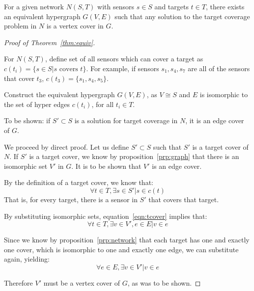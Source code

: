 \begin{thm}
  For a given network $N(S,T)$ with sensors $s\in S$ and targets $t\in T$, there exists an equivalent hypergraph $G(V,E)$ such that any solution to the target coverage problem in $N$ is a vertex cover in $G$.
\label{thm:equiv}
\end{thm}
\begin{proof}[Proof of Theorem~\ref{thm:equiv}]
\begin{prop}
For $N(S,T)$, define set of all sensors which can cover a target as $c(t_i) = \{s \in S | s \text{\ covers\ } t\}$.  For example, if sensors $s_1, s_4, s_7$ are all of the sensors that cover $t_3$, $c(t_3) = \{s_1, s_4, s_5\}$. \label{prp:network}
\end{prop}
\begin{prop}Construct the equivalent hypergraph $G(V,E)$, as $V \cong S$ and $E$ is isomorphic to the set of hyper edges $c(t_i)$, for all $t_i \in T$. 
\label{prp:graph}
\end{prop}

To be shown: if $S' \subset S$ is a solution for target coverage in $N$, it is an edge cover of $G$. 

We proceed by direct proof. Let us define $S'\subset S$ such that $S'$ is a target cover of $N$. If $S'$ is a target cover, we know by proposition~\ref{prp:graph} that there is an isomorphic set $V'$ in $G$. It is to be shown that $V'$ is an edge cover.

By the definition of a target cover, we know that:
\begin{equation}
\forall t \in T, \exists s \in S' | s \in c(t)
\label{eqn:tcover}
\end{equation}
That is, for every target, there is a sensor in $S'$ that covers that target.

By substituting isomorphic sets, equation~\ref{eqn:tcover} implies that:
\begin{equation}
\forall t \in T, \exists v \in V', e \in E | v \in e
\label{eqn:tvbridge}
\end{equation}

Since we know by proposition~\ref{prp:network} that each target has one and exactly one cover, which is isomorphic to one and exactly one edge, we can substitute again, yielding:
\begin{equation}
\forall e \in E, \exists v\in V' | v \in e
\end{equation}

Therefore $V'$ must be a vertex cover of $G$, as was to be shown.  
\end{proof}
